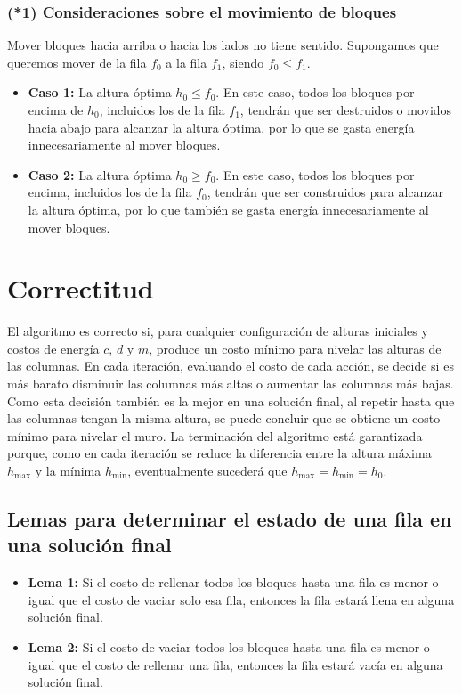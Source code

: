 \documentclass[a4paper,12pt]{article}
\begin{document}
\subsubsection*{(*1) Consideraciones sobre el movimiento de bloques}

Mover bloques hacia arriba o hacia los lados no tiene sentido. Supongamos que queremos mover de la fila $f_0$ a la fila $f_1$, siendo $f_0 \leq f_1$.

\begin{itemize}
	\item \textbf{Caso 1:} La altura óptima $h_0 \leq f_0$. En este caso, todos los bloques por encima de $h_0$, incluidos los de la fila $f_1$, tendrán que ser destruidos o movidos hacia abajo para alcanzar la altura óptima, por lo que se gasta energía innecesariamente al mover bloques.
	\item \textbf{Caso 2:} La altura óptima $h_0 \geq f_0$. En este caso, todos los bloques por encima, incluidos los de la fila $f_0$, tendrán que ser construidos para alcanzar la altura óptima, por lo que también se gasta energía innecesariamente al mover bloques.
\end{itemize}

\section{Correctitud}

El algoritmo es correcto si, para cualquier configuración de alturas iniciales y costos de energía $c$, $d$ y $m$, produce un costo mínimo para nivelar las alturas de las columnas. En cada iteración, evaluando el costo de cada acción, se decide si es más barato disminuir las columnas más altas o aumentar las columnas más bajas. Como esta decisión también es la mejor en una solución final, al repetir hasta que las columnas tengan la misma altura, se puede concluir que se obtiene un costo mínimo para nivelar el muro. La terminación del algoritmo está garantizada porque, como en cada iteración se reduce la diferencia entre la altura máxima $h_{\text{max}}$ y la mínima $h_{\text{min}}$, eventualmente sucederá que $h_{\text{max}} = h_{\text{min}} = h_0$.

\subsection{Lemas para determinar el estado de una fila en una solución final}

\begin{itemize}
	\item \textbf{Lema 1:} Si el costo de rellenar todos los bloques hasta una fila es menor o igual que el costo de vaciar solo esa fila, entonces la fila estará llena en alguna solución final.
	\item \textbf{Lema 2:} Si el costo de vaciar todos los bloques hasta una fila es menor o igual que el costo de rellenar una fila, entonces la fila estará vacía en alguna solución final.
\end{itemize}
\end{document}
